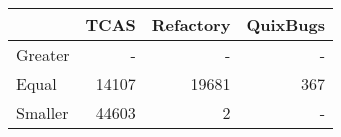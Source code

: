 \begin{tabular}{lrrr}
\toprule
 & \textbf{TCAS} & \textbf{Refactory} & \textbf{QuixBugs} \\
\midrule
Greater & - & - & - \\
Equal & 14107 & 19681 & 367 \\
Smaller & 44603 & 2 & - \\
\bottomrule
\end{tabular}

